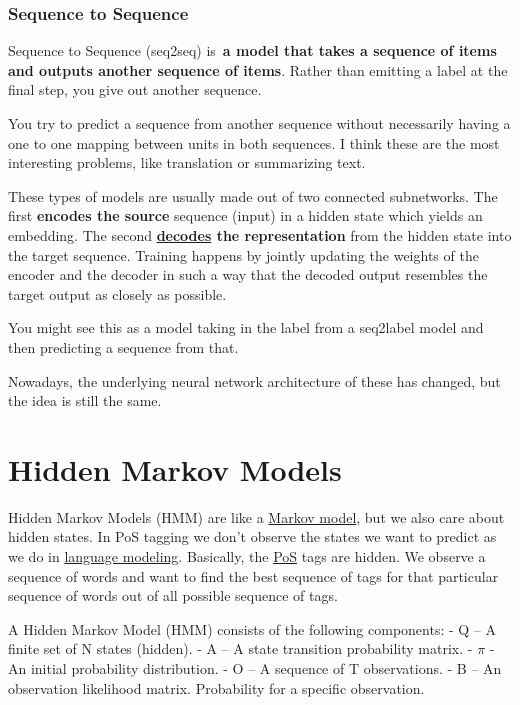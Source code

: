 \documentclass[
  11pt,
  british,
]{article}
\begin{document}
\hypertarget{sequence-to-sequence}{%
\subsubsection{Sequence to Sequence}\label{sequence-to-sequence}}

Sequence to Sequence (seq2seq) is~\textbf{a model that takes a sequence
of items and outputs another sequence of items}. Rather than emitting a
label at the final step, you give out another sequence.

You try to predict a sequence from another sequence without necessarily
having a one to one mapping between units in both sequences. I think
these are the most interesting problems, like translation or summarizing
text.

These types of models are usually made out of two connected subnetworks.
The first \textbf{encodes the source} sequence (input) in a hidden state
which yields an embedding. The second
\textbf{\href{Decoding.md}{decodes} the representation} from the hidden
state into the target sequence. Training happens by jointly updating the
weights of the encoder and the decoder in such a way that the decoded
output resembles the target output as closely as possible.

You might see this as a model taking in the label from a seq2label model
and then predicting a sequence from that.

Nowadays, the underlying neural network architecture of these has
changed, but the idea is still the same.

\hypertarget{hidden-markov-models}{%
\section{Hidden Markov Models}\label{hidden-markov-models}}

Hidden Markov Models (HMM) are like a \href{Markov\%20models.md}{Markov
model}, but we also care about hidden states. In PoS tagging we don't
observe the states we want to predict as we do in
\href{Language\%20Modeling.md}{language modeling}. Basically, the
\href{../Languages/Parts\%20of\%20Speech.md}{PoS} tags are hidden. We
observe a sequence of words and want to find the best sequence of tags
for that particular sequence of words out of all possible sequence of
tags.

A Hidden Markov Model (HMM) consists of the following components: - Q --
A finite set of N states (hidden). - A -- A state transition probability
matrix. - \(\pi\) - An initial probability distribution. - O -- A
sequence of T observations. - B -- An observation likelihood matrix.
Probability for a specific observation.
\end{document}

